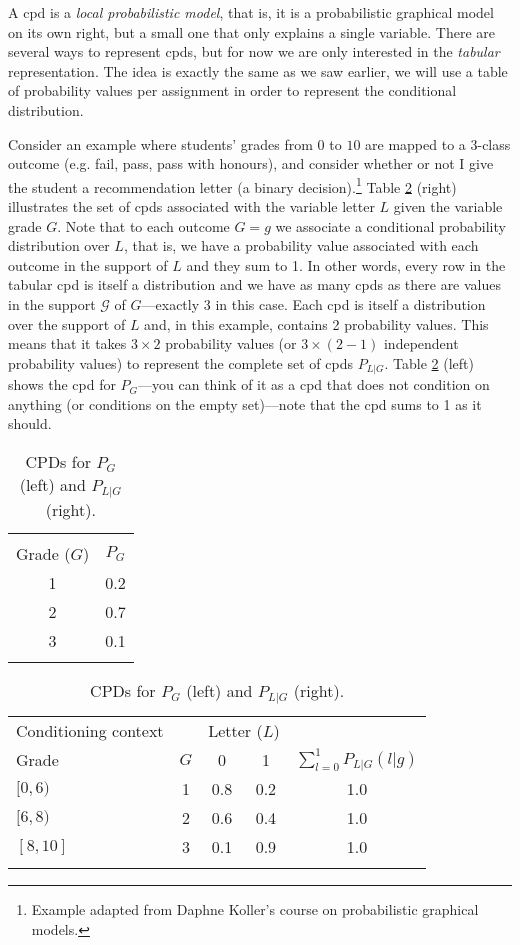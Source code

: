 A cpd is a \emph{local probabilistic model}, that is, it is a probabilistic graphical model on its own right, but a small one that only explains a single variable. 
There are several ways to represent cpds, but for now we are only interested in the \emph{tabular} representation. The idea is exactly the same as we saw earlier, we will use a table of probability values per assignment in order to represent the conditional distribution. 

Consider an example where students' grades from $0$ to $10$ are mapped to a 3-class outcome (e.g. fail, pass, pass with honours), and consider whether or not I give the student a recommendation letter (a binary decision).\footnote{Example adapted from Daphne Koller's course on probabilistic graphical models.} 
Table \ref{tab:cpds} (right) illustrates the set of cpds associated with the variable letter $L$ given the variable grade $G$.
Note that to each outcome $G=g$ we associate a conditional probability distribution over $L$, that is, we have a probability value associated with each outcome in the support of $L$ and they sum to 1. In other words, every row in the tabular cpd is itself a distribution and we have as many cpds as there are values in the support $\mathcal G$ of $G$---exactly 3 in this case. Each cpd is itself a distribution over the support of $L$ and, in this example, contains 2 probability values. This means that it takes $3 \times 2$ probability values (or $3 \times (2-1)$ independent probability values) to represent the complete set of cpds $P_{L|G}$.
Table \ref{tab:cpds} (left) shows the cpd for $P_G$---you can think of it as a cpd that does not condition on anything (or conditions on the empty set)---note that the cpd sums to 1 as it should. 

\begin{table}[h]\small\centering
	\begin{tabular}{c c}
	\multicolumn{2}{c}{} \\
	Grade ($G$) & $P_G$ \\ \hline
	1 & 0.2 \\ 
	2 & 0.7 \\
	3 & 0.1 \\
	\multicolumn{2}{c}{} 
	\end{tabular}
	\qquad
	\begin{tabular}{l c | c c | c }
	Conditioning context &          & \multicolumn{2}{c|}{Letter ($L$)} & \\  
	Grade & $G$          & 0  & 1      &   $\sum_{l=0}^1 P_{L|G}(l|g)$  \\ \hline
	$[0, 6)$ & 1         & 0.8 & 0.2   & 1.0    \\
	$[6, 8)$ & 2         & 0.6 & 0.4   & 1.0     \\
	$[8, 10]$      & 3   & 0.1 & 0.9   & 1.0     \\
	\multicolumn{5}{c}{}
	\end{tabular}
	\caption{\label{tab:cpds}CPDs for $P_G$ (left) and $P_{L|G}$ (right).}
\end{table}

